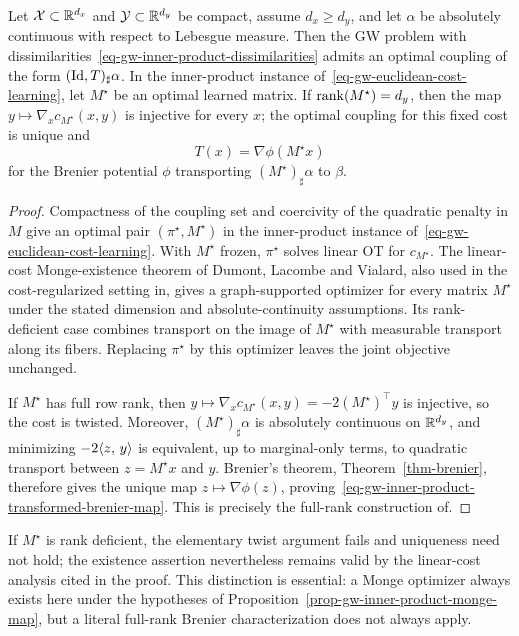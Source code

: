 \begin{prop}\label{prop-gw-inner-product-monge-map}
Let $\mathcal{X}\subset\mathbb{R}^{d_x}$ and $\mathcal{Y}\subset\mathbb{R}^{d_y}$ be compact, assume $d_x\geq d_y$, and let $\alpha$ be absolutely continuous with respect to Lebesgue measure. Then the GW problem with dissimilarities~\eqref{eq-gw-inner-product-dissimilarities} admits an optimal coupling of the form $(\mathrm{Id},T)_\sharp\alpha$. In the inner-product instance of~\eqref{eq-gw-euclidean-cost-learning}, let $M^\star$ be an optimal learned matrix. If $\operatorname{rank}(M^\star)=d_y$, then the map $y\mapsto\nabla_x c_{M^\star}(x,y)$ is injective for every $x$; the optimal coupling for this fixed cost is unique and
\begin{equation}\label{eq-gw-inner-product-transformed-brenier-map}
T(x)=\nabla\phi(M^\star x)
\end{equation}
for the Brenier potential $\phi$ transporting $(M^\star)_\sharp\alpha$ to $\beta$.
\end{prop}
\begin{proof}
Compactness of the coupling set and coercivity of the quadratic penalty in $M$ give an optimal pair $(\pi^\star,M^\star)$ in the inner-product instance of~\eqref{eq-gw-euclidean-cost-learning}. With $M^\star$ frozen, $\pi^\star$ solves linear OT for $c_{M^\star}$. The linear-cost Monge-existence theorem of Dumont, Lacombe and Vialard, also used in the cost-regularized setting in, gives a graph-supported optimizer for every matrix $M^\star$ under the stated dimension and absolute-continuity assumptions. Its rank-deficient case combines transport on the image of $M^\star$ with measurable transport along its fibers. Replacing $\pi^\star$ by this optimizer leaves the joint objective unchanged.

If $M^\star$ has full row rank, then
\(y\longmapsto\nabla_x c_{M^\star}(x,y)=-2(M^\star)^\top y\)
is injective, so the cost is twisted. Moreover, $(M^\star)_\sharp\alpha$ is absolutely continuous on $\mathbb{R}^{d_y}$, and minimizing $-2\langle z,\,y\rangle$ is equivalent, up to marginal-only terms, to quadratic transport between $z=M^\star x$ and $y$. Brenier's theorem, Theorem~\ref{thm-brenier}, therefore gives the unique map $z\mapsto\nabla\phi(z)$, proving~\eqref{eq-gw-inner-product-transformed-brenier-map}. This is precisely the full-rank construction of.
\end{proof}
If $M^\star$ is rank deficient, the elementary twist argument fails and uniqueness need not hold; the existence assertion nevertheless remains valid by the linear-cost analysis cited in the proof. This distinction is essential: a Monge optimizer always exists here under the hypotheses of Proposition~\ref{prop-gw-inner-product-monge-map}, but a literal full-rank Brenier characterization does not always apply.

